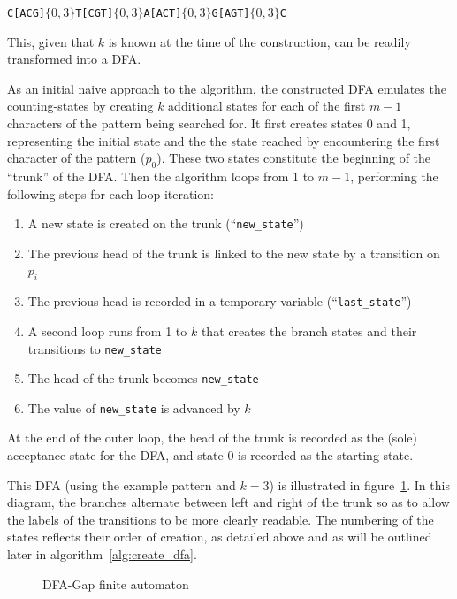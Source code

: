 \begin{center}
\texttt{C[ACG]$\lbrace 0,3 \rbrace$T[CGT]$\lbrace 0,3 \rbrace$A[ACT]$\lbrace 0,3 \rbrace$G[AGT]$\lbrace 0,3 \rbrace$C}
\end{center}

This, given that $k$ is known at the time of the construction, can be readily transformed into a DFA.

As an initial naive approach to the algorithm, the constructed DFA emulates the counting-states by creating $k$ additional states for each of the first $m-1$ characters of the pattern being searched for. It first creates states 0 and 1, representing the initial state and the the state reached by encountering the first character of the pattern ($p_0$). These two states constitute the beginning of the ``trunk'' of the DFA. Then the algorithm loops from 1 to $m-1$, performing the following steps for each loop iteration:

\begin{enumerate}
\item A new state is created on the trunk (``\texttt{new\_state}'')
\item The previous head of the trunk is linked to the new state by a transition on $p_i$
\item The previous head is recorded in a temporary variable (``\texttt{last\_state}'')
\item A second loop runs from 1 to $k$ that creates the branch states and their transitions to \texttt{new\_state}
\item The head of the trunk becomes \texttt{new\_state}
\item The value of \texttt{new\_state} is advanced by $k$
\end{enumerate}

At the end of the outer loop, the head of the trunk is recorded as the (sole) acceptance state for the DFA, and state 0 is recorded as the starting state.

This DFA (using the example pattern and $k=3$) is illustrated in figure~\ref{fig:dfa_dfa}. In this diagram, the branches alternate between left and right of the trunk so as to allow the labels of the transitions to be more clearly readable. The numbering of the states reflects their order of creation, as detailed above and as will be outlined later in algorithm~\ref{alg:create_dfa}.

\begin{figure}[ht]
\centering

\caption{DFA-Gap finite automaton}
\label{fig:dfa_dfa}
\end{figure}

